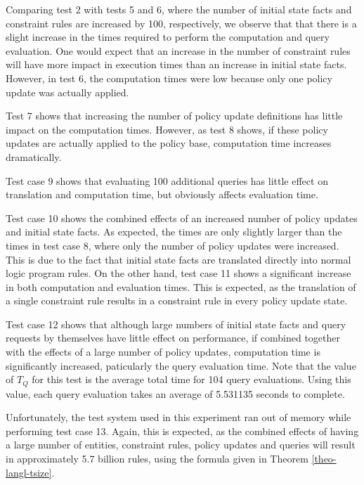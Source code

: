 \documentclass[11pt]{report}
\begin{document}
      Comparing test 2 with tests 5 and 6, where the number of initial state
      facts and constraint rules are increased by 100, respectively, we observe
      that that there is a slight increase in the times required to perform the
      computation and query evaluation. One would expect that an increase in
      the number of constraint rules will have more impact in execution times
      than an increase in initial state facts. However, in test 6, the
      computation times were low because only one policy update was actually
      applied.

      Test 7 shows that increasing the number of policy update definitions
      has little impact on the computation times. However, as test 8 shows,
      if these policy updates are actually applied to the policy base,
      computation time increases dramatically.

      Test case 9 shows that evaluating 100 additional queries has little
      effect on translation and computation time, but obviously affects
      evaluation time.

      Test case 10 shows the combined effects of an increased number of policy
      updates and initial state facts. As expected, the times are only slightly
      larger than the times in test case 8, where only the number of policy
      updates were increased. This is due to the fact that initial state facts
      are translated directly into normal logic program rules. On the other
      hand, test case 11 shows a significant increase in both computation and
      evaluation times. This is expected, as the translation of a single
      constraint rule results in a constraint rule in every policy update
      state.

      Test case 12 shows that although large numbers of initial state facts and
      query requests by themselves have little effect on performance, if
      combined together with the effects of a large number of policy updates,
      computation time is significantly increased, paticularly the query
      evaluation time. Note that the value of $T_{Q}$ for this test is the
      average total time for 104 query evaluations. Using this value, each
      query evaluation takes an average of 5.531135 seconds to complete.

      Unfortunately, the test system used in this experiment ran out of memory
      while performing test case 13. Again, this is expected, as the combined
      effects of having a large number of entities, constraint rules, policy
      updates and queries will result in approximately 5.7 billion rules, using
      the formula given in Theorem \ref{theo-langl-tsize}.
\end{document}
